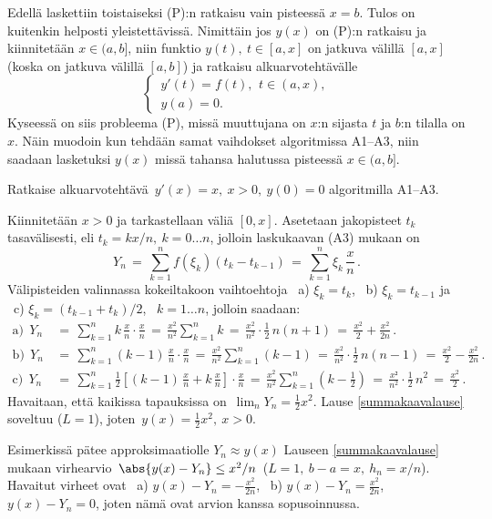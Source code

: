 Edellä laskettiin toistaiseksi (P):n ratkaisu vain pisteessä $x=b$. Tulos on kuitenkin
helposti yleistettävissä. Nimittäin jos $y(x)$ on (P):n ratkaisu ja kiinnitetään $x\in(a,b]$,
niin funktio $y(t),\ t\in[a,x]$ on jatkuva välillä $[a,x]$ (koska on jatkuva välillä
$[a,b]$) ja ratkaisu alkuarvotehtävälle
\[
\begin{cases}
\,y'(t)=f(t),\,\ t\in(a,x), \\ \,y(a)=0.
\end{cases}
\]
Kyseessä on siis probleema (P), missä muuttujana on $x$:n sijasta $t$ ja $b$:n tilalla on $x$.
Näin muodoin kun tehdään samat vaihdokset algoritmissa A1--A3, niin saadaan lasketuksi $y(x)$
missä tahansa halutussa pisteessä $x\in(a,b]$.
\begin{Exa} Ratkaise alkuarvotehtävä $\,y'(x)=x,\ x>0,\ y(0)=0$ algoritmilla A1--A3.
\end{Exa}
\ratk  Kiinnitetään $x>0$ ja tarkastellaan väliä $[0,x]$. Asetetaan jakopisteet $t_k$
tasavälisesti, eli $t_k=kx/n,\ k=0 \ldots n$, jolloin laskukaavan (A3) mukaan on
\[
Y_n \,=\, \sum_{k=1}^n f(\xi_k)(t_k-t_{k-1}) 
    \,=\, \sum_{k=1}^n \xi_k\,\frac{x}{n}\,.
\]
Välipisteiden valinnassa kokeiltakoon vaihtoehtoja \ a) $\xi_k=t_k$, \ b) $\xi_k=t_{k-1}$ ja
\ c) $\xi_k=(t_{k-1}+t_k)/2$, \ $k=1 \ldots n$, jolloin saadaan:
\begin{align*}
\text{a)}\ \ Y_n &\,=\, \sum_{k=1}^{n}k\,\frac{x}{n}\cdot\frac{x}{n}
                  \,=\, \frac{x^2}{n^2}\sum_{k=1}^{n} k
                  \,=\, \frac{x^2}{n^2}\cdot\frac{1}{2}\,n(n+1)
                  \,=\, \frac{x^2}{2}+\frac{x^2}{2n}\,. \\
\text{b)}\ \ Y_n &\,=\, \sum_{k=1}^{n}(k-1)\,\frac{x}{n}\cdot\frac{x}{n}
                  \,=\, \frac{x^2}{n^2}\sum_{k=1}^{n} (k-1)
                  \,=\, \frac{x^2}{n^2}\cdot\frac{1}{2}\,n(n-1)
                  \,=\, \frac{x^2}{2}-\frac{x^2}{2n}\,. \\
\text{c)}\ \ Y_n &\,=\, \sum_{k=1}^{n}\frac{1}{2}\left[(k-1)\,\frac{x}{n}+k\,\frac{x}{n}\right]
                                                                            \cdot\frac{x}{n}
                  \,=\, \frac{x^2}{n^2}\sum_{k=1}^{n} \left(k-\frac{1}{2}\right)
                  \,=\, \frac{x²}{n^2}\cdot\frac{1}{2}\,n^2
                  \,=\, \frac{x^2}{2}\,.
\end{align*}
Havaitaan, että kaikissa tapauksissa on $\,\lim_nY_n=\tfrac{1}{2}x^2$. Lause
\ref{summakaavalause} soveltuu ($L=1$), joten $\,y(x)=\tfrac{1}{2}x^2,\ x>0$. \loppu

Esimerkissä pätee approksimaatiolle $Y_n \approx y(x)$ Lauseen \ref{summakaavalause} mukaan 
virhearvio $\,\abs{y(x)-Y_n} \le x^2/n\,$ ($L=1,\ b-a=x,\ h_n=x/n$). Havaitut virheet ovat
\ a) $y(x)-Y_n=-\tfrac{x^2}{2n}$, \ b) $y(x)-Y_n=\tfrac{x^2}{2n}$, \ $y(x)-Y_n=0$, joten
nämä ovat arvion kanssa sopusoinnussa.

